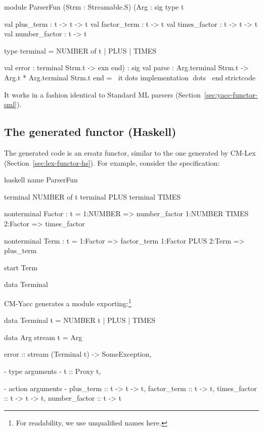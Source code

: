 \documentclass[10pt]{article}
\begin{document}
\begin{strictcode}
\begin{strictcode}
\begin{strictcode}
\begin{strictcode}
\begin{strictcode}
\begin{strictcode}
\begin{strictcode}
\begin{strictcode}
\begin{strictcode}
module ParserFun
   (Strm : Streamable.S)
   (Arg :
       sig
          type t

          val plus_term : t -> t -> t
          val factor_term : t -> t
          val times_factor : t -> t -> t
          val number_factor : t -> t

          type terminal =
             NUMBER of t
           | PLUS
           | TIMES

          val error : terminal Strm.t -> exn
       end)
   :
   sig
      val parse : Arg.terminal Strm.t -> Arg.t * Arg.terminal Strm.t
   end
= itdots implementation dots
endstrictcode

It works in a fashion identical to Standard ML parsers
(Section~\ref{sec:yacc-functor-sml}).




\subsection{The generated functor (Haskell)}

The generated code is an ersatz functor, similar to the one generated
by CM-Lex (Section~\ref{sec:lex-functor-hs}).  For example, consider
the specification:

\begin{code}
haskell
name ParserFun

terminal NUMBER of t
terminal PLUS
terminal TIMES

nonterminal Factor : t =
  1:NUMBER => number_factor
  1:NUMBER TIMES 2:Factor => times_factor

nonterminal Term : t =
  1:Factor => factor_term
  1:Factor PLUS 2:Term => plus_term

start Term

data Terminal
\end{code}

CM-Yacc generates a module exporting:\footnote{For readability, we
use unqualified names here.}

\begin{strictcode}
data Terminal t =
   NUMBER t
 | PLUS
 | TIMES

data Arg stream t =
   Arg { error :: stream (Terminal t) -> SomeException,

         {- type arguments -}
         t :: Proxy t,

         {- action arguments -}
         plus_term :: t -> t -> t,
         factor_term :: t -> t,
         times_factor :: t -> t -> t,
         number_factor :: t -> t }


\end{strictcode}
\end{strictcode}
\end{strictcode}
\end{strictcode}
\end{strictcode}
\end{strictcode}
\end{strictcode}
\end{strictcode}
\end{strictcode}
\end{strictcode}
\end{document}
